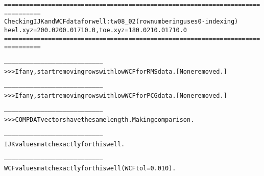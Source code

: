 \begin{alltt}
================================================================================
Checking IJK and WCF data for well: tw08_02 (row numbering uses 0-indexing)
heel.xyz = 200.0 200.0 1710.0, toe.xyz = 180.0 210.0 1710.0
================================================================================

--------------------------------------------------------------------------------
>>> If any, start removing rows with low WCF for RMS data. [None removed.]

--------------------------------------------------------------------------------
>>> If any, start removing rows with low WCF for PCG data. [None removed.]

--------------------------------------------------------------------------------
>>> COMPDAT vectors have the same length. Making comparison.

--------------------------------------------------------------------------------
IJK values match exactly for this well.

--------------------------------------------------------------------------------
WCF values match exactly for this well (WCF tol = 0.010).
\end{alltt}
